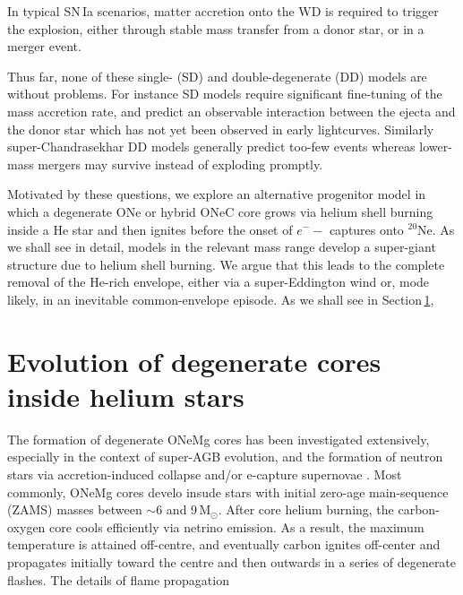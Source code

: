 \documentclass[twocolumn,tighten,times]{aastex62}
\begin{document}
 In  typical SN\,Ia scenarios, matter accretion onto the WD is required to trigger the explosion, either through stable mass transfer from a donor star,  or in a merger event.  
 
 
 
Thus far, none of these single- (SD) and double-degenerate (DD) models 
are without problems. For instance SD models require significant 
fine-tuning of the mass accretion rate, and predict an observable 
interaction between the ejecta and the donor star which has not yet 
been observed in early lightcurves. 
Similarly super-Chandrasekhar DD models generally 
predict too-few events whereas lower-mass mergers may survive instead of exploding promptly. 

Motivated by these questions, we explore an alternative progenitor model
in which a degenerate ONe or hybrid ONeC core grows via helium shell burning 
inside a He star and then ignites before the onset of $e^{-}-$ captures onto $^{20}$Ne. 
As we shall see in detail, models in the relevant mass range develop a 
super-giant structure due to helium shell burning. We argue that 
this leads to the complete removal of the He-rich envelope, 
either via a super-Eddington wind or, mode likely, in an inevitable common-envelope episode. 
As we shall see in Section\,\ref{sec:2}, 


\section{Evolution of degenerate cores inside helium stars}\label{sec:2}
The formation of degenerate ONeMg cores has been investigated extensively, 
especially in the context of super-AGB evolution, 
and the formation of neutron stars via accretion-induced collapse 
and/or e-capture supernovae \citep[][]{}.
Most commonly, ONeMg cores develo insude stars with initial zero-age 
main-sequence (ZAMS) masses between $\sim 6$ and 9\,M$_{\odot}$. 
After core helium burning, the carbon-oxygen core cools efficiently via netrino emission. 
As a result, the maximum temperature is attained off-centre, and eventually 
carbon ignites off-center and propagates initially toward the centre and then outwards 
in a series of degenerate flashes. The details of flame propagation 
\end{document}
